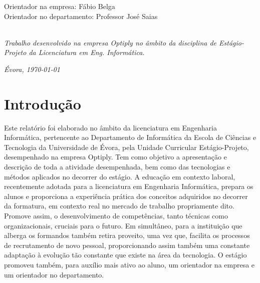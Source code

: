 \documentclass{article}
\begin{document}
\begin{titlepage}
\noindent
Orientador na empresa: Fábio Belga\\     
Orientador no departamento: Professor José Saias

\emph{\\Trabalho desenvolvido na empresa Optiply no âmbito da disciplina de Estágio-Projeto da Licenciatura em Eng. Informática.}\\ 

\begin{flushright}
\emph{Évora, \today}
\end{flushright}

\end{titlepage}


\cleardoublepage
\tableofcontents

\cleardoublepage
{}
\section{Introdução}
\hspace*{0.5cm} Este relatório foi elaborado no âmbito da licenciatura em Engenharia Informática, pertencente ao Departamento de Informática da Escola de Ciências e Tecnologia da Universidade de Évora, pela Unidade Curricular Estágio-Projeto, desempenhado na empresa Optiply. Tem como objetivo a apresentação e descrição de toda a atividade desempenhada, bem como das tecnologias e métodos aplicados no decorrer do estágio. \newline
\hspace*{0.5cm} A educação em contexto laboral, recentemente adotada para a licenciatura em Engenharia Informática, prepara os alunos e proporciona a experiência prática dos conceitos adquiridos no decorrer da formatura, em contexto real no mercado de trabalho propriamente dito. Promove assim, o desenvolvimento de competências, tanto técnicas como organizacionais, cruciais para o futuro. \newline
\hspace*{0.5cm} Em simultâneo, para a instituição que alberga os formandos também retira proveito, uma vez que, facilita os processos de recrutamento de novo pessoal, proporcionando assim também uma constante adaptação à evolução tão constante que existe na área da tecnologia. \newline
\hspace*{0.5cm} O estágio promoveu também, para auxílio mais ativo ao aluno, um orientador na empresa e um orientador no departamento.
\end{document}
